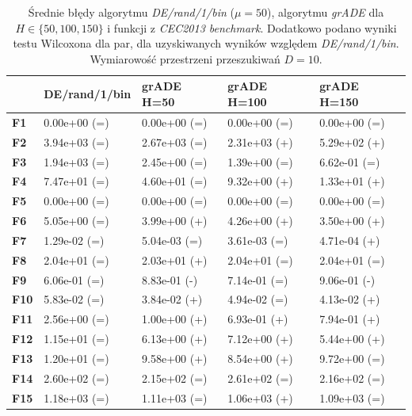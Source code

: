 \documentclass[12pt,a4paper]{report}
\begin{document}
{{{{{{{\begin{table}[h]
\centering
\caption{Średnie błędy algorytmu \emph{DE/rand/1/bin} ($\mu = 50$), algorytmu \emph{grADE} dla $H \in \{50, 100, 150\}$ i funkcji z \emph{CEC2013 benchmark}. Dodatkowo podano wyniki testu Wilcoxona dla par, dla uzyskiwanych wyników względem \emph{DE/rand/1/bin}. Wymiarowość przestrzeni przeszukiwań $D = 10$.}
\label{Anal15}
\begin{tabular}{|l|l|l|l|l|}
\hline
          & {\bf DE/rand/1/bin} & {\bf grADE H=50} & {\bf grADE H=100} & {\bf grADE H=150} \\ \hline
{\bf F1}  & 0.00e+00 (=)        & 0.00e+00 (=)     & 0.00e+00 (=)      & 0.00e+00 (=)      \\ \hline
{\bf F2}  & 3.94e+03 (=)        & 2.67e+03 (=)     & 2.31e+03 (+)      & 5.29e+02 (+)      \\ \hline
{\bf F3}  & 1.94e+03 (=)        & 2.45e+00 (=)     & 1.39e+00 (=)      & 6.62e-01 (=)      \\ \hline
{\bf F4}  & 7.47e+01 (=)        & 4.60e+01 (=)     & 9.32e+00 (+)      & 1.33e+01 (+)      \\ \hline
{\bf F5}  & 0.00e+00 (=)        & 0.00e+00 (=)     & 0.00e+00 (=)      & 0.00e+00 (=)      \\ \hline
{\bf F6}  & 5.05e+00 (=)        & 3.99e+00 (+)     & 4.26e+00 (+)      & 3.50e+00 (+)      \\ \hline
{\bf F7}  & 1.29e-02 (=)        & 5.04e-03 (=)     & 3.61e-03 (=)      & 4.71e-04 (+)      \\ \hline
{\bf F8}  & 2.04e+01 (=)        & 2.03e+01 (+)     & 2.04e+01 (=)      & 2.04e+01 (=)      \\ \hline
{\bf F9}  & 6.06e-01 (=)        & 8.83e-01 (-)     & 7.14e-01 (=)      & 9.06e-01 (-)      \\ \hline
{\bf F10} & 5.83e-02 (=)        & 3.84e-02 (+)     & 4.94e-02 (=)      & 4.13e-02 (+)      \\ \hline
{\bf F11} & 2.56e+00 (=)        & 1.00e+00 (+)     & 6.93e-01 (+)      & 7.94e-01 (+)      \\ \hline
{\bf F12} & 1.15e+01 (=)        & 6.13e+00 (+)     & 7.12e+00 (+)      & 5.44e+00 (+)      \\ \hline
{\bf F13} & 1.20e+01 (=)        & 9.58e+00 (+)     & 8.54e+00 (+)      & 9.72e+00 (=)      \\ \hline
{\bf F14} & 2.60e+02 (=)        & 2.15e+02 (=)     & 2.61e+02 (=)      & 2.16e+02 (=)      \\ \hline
{\bf F15} & 1.18e+03 (=)        & 1.11e+03 (=)     & 1.06e+03 (+)      & 1.09e+03 (=)      \\ \hline

\end{tabular}
\end{table}}}}}}}}
\end{document}
